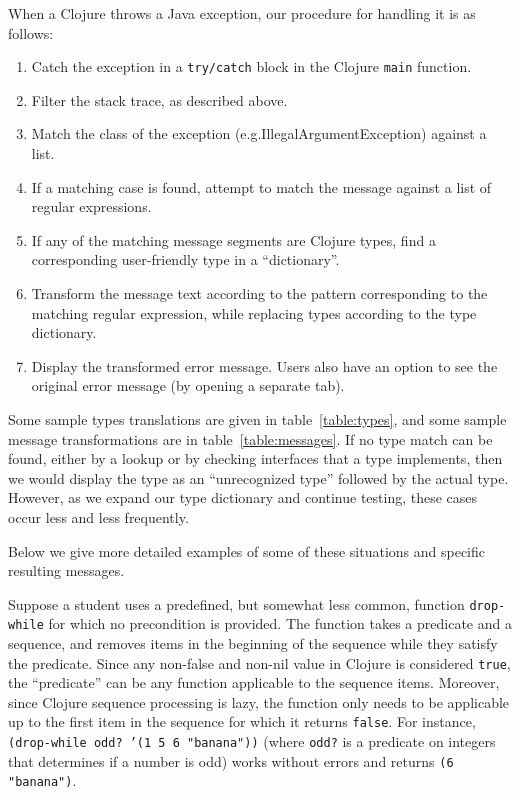 \documentclass[submission,copyright,creativecommons]{eptcs}
\newcommand{\clocode}[1]{{\tt {#1}}}
\begin{document}
When a Clojure throws a Java exception, our procedure for handling it is as follows:
\begin{enumerate}
\item Catch the exception in a {\tt try/catch} block in the Clojure {\tt main} function. 
\item Filter the stack trace, as described above. 
\item Match the class of the exception (e.g.IllegalArgumentException) against a list. 
\item If a matching case is found, attempt to match the message against a list of regular expressions. 
\item If any of the matching message segments are Clojure types, find a corresponding user-friendly type in a ``dictionary''. 
\item Transform the message text according to the pattern corresponding to the matching regular expression, while replacing types according to the type dictionary.  
\item Display the transformed error message. Users also have an option to see the original error message (by opening a separate tab). 
\end{enumerate}
Some sample types translations are given in table~\ref{table:types}, and some sample message transformations are in table~\ref{table:messages}. If no type match can be found, either by a lookup or by checking interfaces that a type implements, %
then we would display the type as an ``unrecognized type'' followed by the actual type. However, as we expand our type dictionary and continue testing, these cases occur less and less frequently. 

Below we give more detailed examples of some of these situations and specific resulting messages. 

Suppose a student uses a predefined, but somewhat less common, function \clocode{drop-while} for which no precondition is provided. The function takes a predicate and a sequence, and removes items in the beginning of the sequence while they satisfy the predicate. Since any non-false and non-nil value in Clojure is considered {\tt true}, the ``predicate'' can be any function applicable to the sequence items. Moreover, since Clojure sequence processing is lazy, the function only needs to be applicable up to the first item in the sequence for which it returns {\tt false}. For instance, \clocode{(drop-while odd? '(1 5 6 "banana"))} (where \clocode{odd?} is a predicate on integers that determines if a number is odd) works without errors and returns \clocode{(6 "banana")}. 
\end{document}
